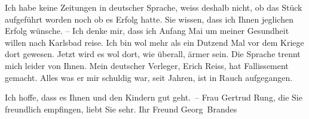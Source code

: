 \pstart
           {\pb}Ich habe keine Zeitungen in
               deutscher Sprache, weiss deshalb nicht, ob das Stück aufgeführt worden noch ob es Erfolg hatte. Sie
               wissen, dass ich Ihnen jeglichen Erfolg wünsche. – Ich denke mir, dass ich
                  Anfang Mai um meiner Gesundheit willen nach Karlsbad reise. Ich bin wol mehr als ein Dutzend Mal vor dem
               Kriege dort gewesen. Jetzt wird es wol dort, wie überall,  ärmer sein. Die Sprache trennt mich leider von Ihnen. Mein deutscher
               Verleger, Erich Reiss, hat Fallissement
               gemacht. Alles was er mir schuldig war, seit Jahren, ist in Rauch aufgegangen.\pend
           
\pstart
           Ich hoffe, dass es Ihnen und den Kindern gut geht. – Frau Gertrud Rung, die Sie freundlich empfingen, liebt Sie sehr. Ihr Freund
                  \spacefill\mbox{Georg Brandes}\pend
           \endnumbering{}  
      